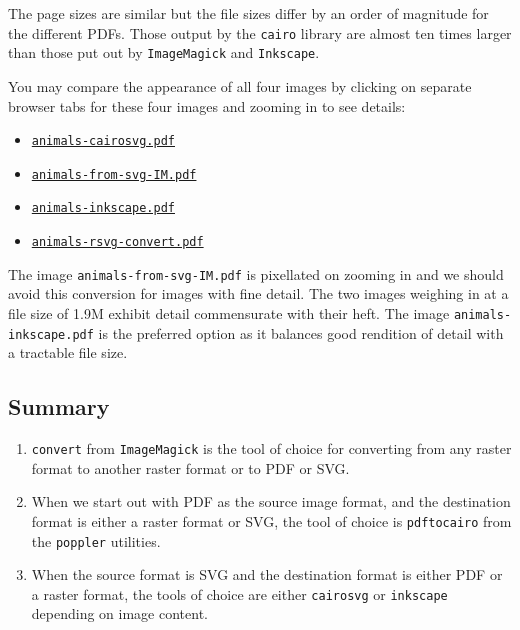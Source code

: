 \documentclass[
  12pt,
  british,
  a4paper,
  rgb,
  dvipsnames,
  svgnames,
  hyphens]{article}
\providecommand{\tightlist}{%
  \setlength{\itemsep}{0pt}\setlength{\parskip}{0pt}}
\begin{document}
The page sizes are similar but the file sizes differ by an order of
magnitude for the different PDFs. Those output by the \texttt{cairo}
library are almost ten times larger than those put out by
\texttt{ImageMagick} and \texttt{Inkscape}.

You may compare the appearance of all four images by clicking on
separate browser tabs for these four images and zooming in to see
details:

\begin{itemize}
\tightlist
\item
  \href{images/animals-cairosvg.pdf}{\texttt{animals-cairosvg.pdf}}
\item
  \href{images/animals-from-svg-IM.pdf}{\texttt{animals-from-svg-IM.pdf}}
\item
  \href{images/animals-inkscape.pdf}{\texttt{animals-inkscape.pdf}}
\item
  \href{images/animals-rsvg-convert.pdf}{\texttt{animals-rsvg-convert.pdf}}
\end{itemize}

The image \texttt{animals-from-svg-IM.pdf} is pixellated on zooming in
and we should avoid this conversion for images with fine detail. The two
images weighing in at a file size of 1.9M exhibit detail commensurate
with their heft. The image \texttt{animals-inkscape.pdf} is the
preferred option as it balances good rendition of detail with a
tractable file size.

\hypertarget{summary}{%
\subsection{Summary}\label{summary}}

\begin{enumerate}
\item
  \texttt{convert} from \texttt{ImageMagick} is the tool of choice for
  converting from any raster format to another raster format or to PDF
  or SVG.
\item
  When we start out with PDF as the source image format, and the
  destination format is either a raster format or SVG, the tool of
  choice is \texttt{pdftocairo} from the \texttt{poppler} utilities.
\item
  When the source format is SVG and the destination format is either PDF
  or a raster format, the tools of choice are either \texttt{cairosvg}
  or \texttt{inkscape} depending on image content.
\end{enumerate}
\end{document}
